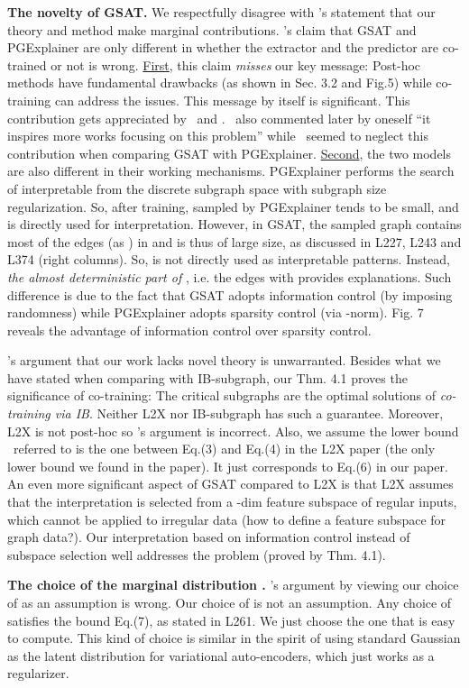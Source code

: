 \documentclass{article}
\begin{document}
\textbf{The novelty of GSAT.} We respectfully disagree with \Rf's statement that our theory and method make marginal contributions. \Rf's claim that GSAT and PGExplainer are only different in whether the extractor and the predictor are co-trained or not is wrong. \underline{First}, this claim \emph{misses} our key message: Post-hoc methods have fundamental drawbacks (as shown in Sec. 3.2 and Fig.5) while co-training can address the issues. This message by itself is significant. This contribution gets appreciated by \Rt~and \Rv. \Rf~also commented later by oneself ``it inspires more works focusing on this problem'' while \Rf~seemed to neglect this contribution when comparing GSAT with PGExplainer. \underline{Second}, the two models are also different in their working mechanisms.  PGExplainer performs the search of interpretable  from the discrete subgraph space with subgraph size regularization. So, after training,  sampled by PGExplainer tends to be small, and is directly used for interpretation. However, in GSAT, the sampled graph  contains most of the edges (as ) in  and is thus of large size, as discussed in L227, L243 and L374 (right columns). So,  is not directly used as interpretable patterns. Instead, \emph{the almost deterministic part of }, i.e. the edges with  provides explanations. Such difference is due to the fact that GSAT adopts information control (by imposing randomness) while PGExplainer adopts sparsity control (via -norm). Fig. 7 reveals the advantage of information control over sparsity control.

\Rf's argument that our work lacks novel theory is unwarranted. Besides what we have stated when comparing with IB-subgraph, our Thm. 4.1 proves the significance of co-training: The critical subgraphs are the optimal solutions of \emph{co-training via IB}. Neither L2X nor IB-subgraph has such a guarantee. Moreover, L2X is not post-hoc so \Rf's argument is incorrect. Also, we assume the lower bound \Rf~referred to is the one between Eq.(3) and Eq.(4) in the L2X paper (the only lower bound we found in the paper). It just corresponds to Eq.(6) in our paper. An even more significant aspect of GSAT compared to L2X is that L2X assumes that the interpretation is selected from a -dim feature subspace of regular inputs, which cannot be applied to irregular data (how to define a feature subspace for graph data?). Our interpretation based on information control instead of subspace selection well addresses the problem (proved by Thm. 4.1).   

\textbf{The choice of the marginal distribution .} \Rf's argument by viewing our choice of  as an assumption is wrong. Our choice of  is not an assumption. Any choice of  satisfies the bound Eq.(7), as stated in L261. We just choose the one that is easy to compute. This kind of choice is similar in the spirit of using standard Gaussian as the latent distribution for variational auto-encoders, which just works as a regularizer.    
\end{document}

